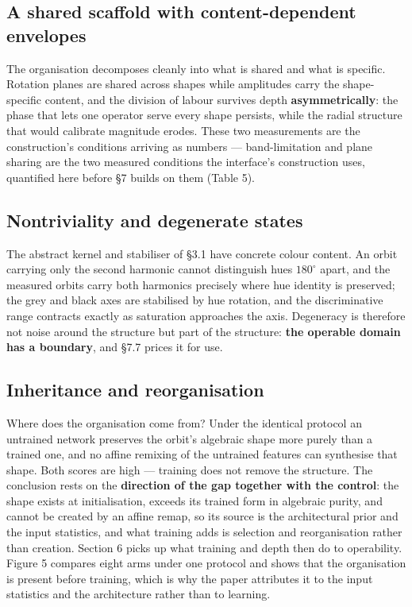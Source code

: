 \subsection{A shared scaffold with content-dependent envelopes}

The organisation decomposes cleanly into what is shared and what is specific. Rotation planes are shared across shapes while amplitudes carry the shape-specific content, and the division of labour survives depth \textbf{asymmetrically}: the phase that lets one operator serve every shape persists, while the radial structure that would calibrate magnitude erodes. These two measurements are the construction's conditions arriving as numbers --- band-limitation and plane sharing are the two measured conditions the interface's construction uses, quantified here before \S{}7 builds on them (Table 5).

\subsection{Nontriviality and degenerate states}

The abstract kernel and stabiliser of \S{}3.1 have concrete colour content. An orbit carrying only the second harmonic cannot distinguish hues $180^\circ$ apart, and the measured orbits carry both harmonics precisely where hue identity is preserved; the grey and black axes are stabilised by hue rotation, and the discriminative range contracts exactly as saturation approaches the axis. Degeneracy is therefore not noise around the structure but part of the structure: \textbf{the operable domain has a boundary}, and \S{}7.7 prices it for use.

\subsection{Inheritance and reorganisation}

Where does the organisation come from? Under the identical protocol an untrained network preserves the orbit's algebraic shape more purely than a trained one, and no affine remixing of the untrained features can synthesise that shape. Both scores are high --- training does not remove the structure. The conclusion rests on the \textbf{direction of the gap together with the control}: the shape exists at initialisation, exceeds its trained form in algebraic purity, and cannot be created by an affine remap, so its source is the architectural prior and the input statistics, and what training adds is selection and reorganisation rather than creation. Section 6 picks up what training and depth then do to operability. Figure 5 compares eight arms under one protocol and shows that the organisation is present before training, which is why the paper attributes it to the input statistics and the architecture rather than to learning.

